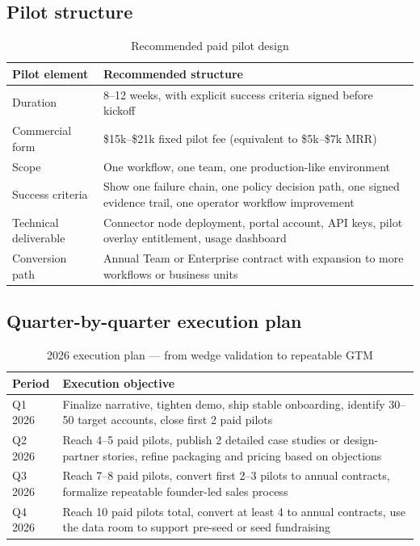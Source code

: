 \subsection{Pilot structure}

\begin{table}[H]
\centering
\renewcommand{\arraystretch}{1.45}
\begin{tabularx}{\textwidth}{@{}lX@{}}
\toprule
\textbf{Pilot element} & \textbf{Recommended structure} \\
\midrule
Duration & 8--12 weeks, with explicit success criteria signed before kickoff \\
Commercial form & \$15k--\$21k fixed pilot fee (equivalent to \$5k--\$7k MRR) \\
Scope & One workflow, one team, one production-like environment \\
Success criteria & Show one failure chain, one policy decision path, one signed evidence trail, one operator workflow improvement \\
Technical deliverable & Connector node deployment, portal account, API keys, pilot overlay entitlement, usage dashboard \\
Conversion path & Annual Team or Enterprise contract with expansion to more workflows or business units \\
\bottomrule
\end{tabularx}
\caption{Recommended paid pilot design}
\end{table}

\subsection{Quarter-by-quarter execution plan}

\begin{table}[H]
\centering
\renewcommand{\arraystretch}{1.45}
\begin{tabularx}{\textwidth}{@{}lX@{}}
\toprule
\textbf{Period} & \textbf{Execution objective} \\
\midrule
Q1 2026 & Finalize narrative, tighten demo, ship stable onboarding, identify 30--50 target accounts, close first 2 paid pilots \\
Q2 2026 & Reach 4--5 paid pilots, publish 2 detailed case studies or design-partner stories, refine packaging and pricing based on objections \\
Q3 2026 & Reach 7--8 paid pilots, convert first 2--3 pilots to annual contracts, formalize repeatable founder-led sales process \\
Q4 2026 & Reach 10 paid pilots total, convert at least 4 to annual contracts, use the data room to support pre-seed or seed fundraising \\
\bottomrule
\end{tabularx}
\caption{2026 execution plan — from wedge validation to repeatable GTM}
\end{table}

